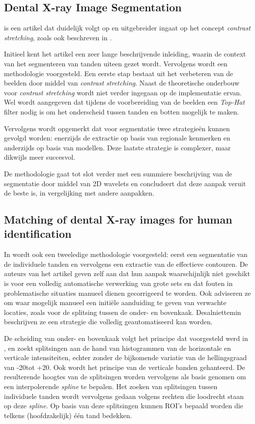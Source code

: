 \documentclass[10pt,a4paper]{article}
\begin{document}
\subsection*{Dental X-ray Image Segmentation}

\cite{said2004dental} is een artikel dat duidelijk volgt op \cite{abdel2003challenges} en uitgebreider ingaat op het concept \emph{contrast stretching}, zoals ook beschreven in \cite{piotrowski2000active}.

Initieel kent het artikel een zeer lange beschrijvende inleiding, waarin de context van het segmenteren van tanden uiteen gezet wordt. Vervolgens wordt een methodologie voorgesteld. Een eerste stap bestaat uit het verbeteren van de beelden door middel van \emph{contrast stretching}. Naast de theoretische onderbouw voor \emph{contrast stretching} wordt niet verder ingegaan op de implementatie ervan. Wel wordt aangegeven dat tijdens de voorbereiding van de beelden een \emph{Top-Hat} filter nodig is om het onderscheid tussen tanden en botten mogelijk te maken.

Vervolgens wordt opgemerkt dat voor segmentatie twee strategie\"en kunnen gevolgd worden: enerzijds de extractie op basis van regionale kenmerken en anderzijds op basis van modellen. Deze laatste strategie is complexer, maar dikwijls meer succesvol.

De methodologie gaat tot slot verder met een summiere beschrijving van de segmentatie door middel van 2D wavelets en concludeert dat deze aanpak veruit de beste is, in vergelijking met andere aanpakken.

\subsection*{Matching of dental X-ray images for human identification}

In \cite{jain2004matching} wordt ook een tweeledige methodologie voorgesteld: eerst een segmentatie van de individuele tanden en vervolgens een extractie van de effectieve contouren. De auteurs van het artikel geven zelf aan dat hun aanpak waarschijnlijk niet geschikt is voor een volledig automatische verwerking van grote sets en dat fouten in problematische situaties manueel dienen gecorrigeerd te worden. Ook adviseren ze om waar mogelijk manueel een initi\"ele aanduiding te geven van verwachte locaties, zoals voor de splitsing tussen de onder- en bovenkaak. Desalniettemin beschrijven ze een strategie die volledig geautomatiseerd kan worden.

De scheiding van onder- en bovenkaak volgt het principe dat voorgesteld werd in \cite{abdel2003challenges}, en zoekt splitsingen aan de hand van histogrammen van de horizontale en verticale intensiteiten, echter zonder de bijkomende variatie van de hellingsgraad van -20\degree tot +20\degree. Ook wordt het principe van de verticale banden gehanteerd. De resulterende hoogtes van de splitsingen worden vervolgens als basis genomen om een interpolerende \emph{spline} te bepalen.  Het zoeken van splitsingen tussen individuele tanden wordt vervolgens gedaan volgens rechten die loodrecht staan op deze \emph{spline}. Op basis van deze splitsingen kunnen ROI's bepaald worden die telkens (hoofdzakelijk) \'e\'en tand bedekken. 
\end{document}
